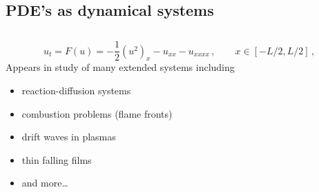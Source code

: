 \documentclass{beamer}
\begin{document}
\subsection{PDE's as dynamical systems}

\begin{frame}

\begin{block}{}

	
\end{block}

\end{frame}



\subsection{\KSe}

\begin{frame}{\KSe}
\[
  u_t = F(u) = -{\textstyle\frac{1}{2}}(u^2)_x-u_{xx}-u_{xxxx}
    \,,\qquad   x \in [-L/2,L/2]
    \,, 
\]
Appears in study of many extended systems including
\begin{itemize}
 \item reaction-diffusion systems
 \item combustion problems (flame fronts)
 \item drift waves in plasmas
 \item thin falling films
 \item and more\ldots
\end{itemize}

\end{frame}
\end{document}
